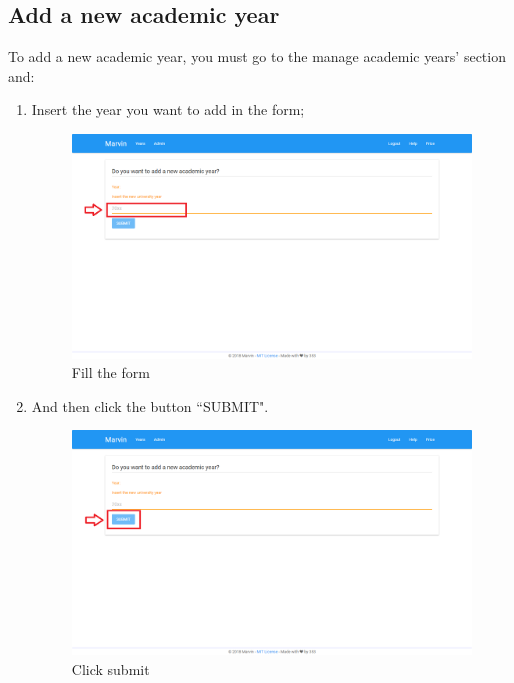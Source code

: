\documentclass[ManualeUtente]{subfiles}
\begin{document}
	\subsection{Add a new academic year}
	To add a new academic year, you must go to the manage academic years' section and:
	\begin{enumerate}
		\item Insert the year you want to add in the form;
		\begin{figure}[H]
			\centering
			\includegraphics[width=0.7\linewidth]{image/UniversityAddYear1}
			\caption[Add year form]{Fill the form}
			\label{fig:Add a new academic year, fill the form}
		\end{figure}
		\item And then click the button ``SUBMIT".
		\begin{figure}[H]
			\centering
			\includegraphics[width=0.7\linewidth]{image/UniversityAddYear2}
			\caption[Add year submit]{Click submit}
			\label{fig:Add a new academic year, click submit}
		\end{figure}
	\end{enumerate}
\end{document}
